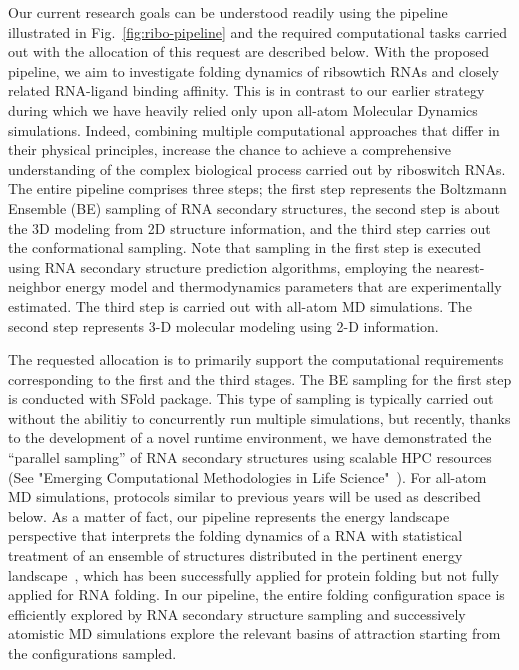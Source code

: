 \documentclass[a4paper,11pt]{article}
\begin{document}
Our current research goals can be understood readily using the pipeline illustrated in Fig.~\ref{fig:ribo-pipeline} and the required computational tasks carried out with the allocation of this request are described below. With the proposed pipeline, we aim to investigate folding dynamics of ribsowtich RNAs and closely related RNA-ligand binding affinity.  This is in contrast to our earlier strategy during which we have heavily relied only upon all-atom Molecular Dynamics simulations.  Indeed, combining multiple computational approaches that differ in their physical principles, increase the chance to achieve a comprehensive understanding of the complex biological process carried out by riboswitch RNAs.  The entire pipeline comprises three steps; the first step represents the Boltzmann Ensemble (BE) sampling of RNA secondary structures, the second step is about the 3D modeling from 2D structure information, and the third step carries out the conformational sampling.  Note that sampling in the first step is executed using RNA secondary structure prediction algorithms, employing the nearest-neighbor energy model and thermodynamics parameters that are experimentally estimated.  The third step is carried out with all-atom MD simulations. The second step represents 3-D molecular modeling using 2-D information.

The requested allocation is to primarily support the computational requirements corresponding to the first and the third stages. The BE sampling for the first step is conducted with SFold package\cite{ding2006}.  This type of sampling is typically carried out without the abilitiy to concurrently run multiple simulations, but recently, thanks to the development of a novel runtime environment, we have demonstrated the ``parallel sampling'' of RNA secondary structures using scalable HPC resources (See "Emerging Computational Methodologies in Life Science"~\cite{ecmls10}). For all-atom MD simulations, protocols similar to previous years will be used as described below. As a matter of fact, our pipeline represents the energy landscape perspective that interprets the folding dynamics of a RNA with statistical treatment of an ensemble of structures distributed in the pertinent energy landscape~\cite{onuchic1997}, which has been successfully applied for protein folding but not fully applied for RNA folding\cite{cupal1997}. In our pipeline, the entire folding configuration space is efficiently explored by RNA secondary structure sampling and successively atomistic MD simulations explore the relevant basins of attraction starting from the configurations sampled.
\end{document}
